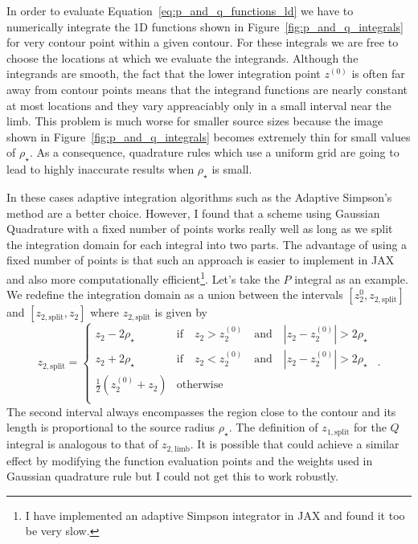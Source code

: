 \documentclass[12pt,dvipsnames]{report}
\newcommand{\ssf}[1]{\textsf{#1}}
\newcommand{\hquad}{~~}
\begin{document}
In order to evaluate Equation~\ref{eq:p_and_q_functions_ld} we have to numerically integrate
the 1D functions shown in Figure~\ref{fig:p_and_q_integrals} for very contour point within
a given contour.
For these integrals we are free to choose the locations at which we evaluate the integrands. 
Although the integrands are smooth, the fact that the  lower integration point $z^{(0)}$ is 
often far away from contour points means that the integrand
functions are nearly constant at most locations and they vary appreaciably only in a small
interval near the limb. This problem is much worse for smaller source sizes because the 
image shown in Figure~\ref{fig:p_and_q_integrals} becomes extremely thin for small values 
of $\rho_\star$. As a consequence, quadrature rules which use a uniform grid are going to 
lead to highly inaccurate results when $\rho_\star$ is small.

In these cases adaptive integration algorithms such as the Adaptive Simpson's method 
are a better choice. However, I found that a scheme using \ssf{Gaussian Quadrature} with a 
fixed number of points works really well as long as we split the integration domain for each 
integral into two parts. 
The advantage of using a fixed number of points is that such an approach is easier to implement 
in \ssf{JAX} and also more computationally efficient\footnote{I have implemented an
adaptive Simpson integrator in \ssf{JAX} and found it too be very slow.}. 
Let's take the $P$ integral as an example. We redefine the integration domain 
as a union between the intervals $[z_2^{0}, z_{2,\mathrm{split}}]$
and $[z_{2,\mathrm{split}}, z_2]$ where $z_{2, \mathrm{split}}$ is given by
\begin{equation}
        z_{2,\mathrm{split}}=
    \begin{cases}
       z_2 - 2\rho_\star & \text{if}\quad z_2> z_2^{(0)} \quad\text{and}\quad |z_2 - z_2^{(0)}|>2\rho_\star\\
       z_2 + 2\rho_\star & \text{if}\quad z_2 < z_2^{(0)} \quad\text{and}\quad |z_2 - z_2^{(0)}|>2\rho_\star\\
       \frac{1}{2}(z_2^{(0)} + z_2) &\text{otherwise}\\
    \end{cases}
    \hquad .
    \label{eq:z_split}
\end{equation}
The second interval always encompasses the region close to the contour and its length 
is proportional to the source radius $\rho_\star$.  The definition of $z_{1,\mathrm{split}}$
for the $Q$ integral is analogous to that of $z_{2, \mathrm{limb}}$.
It is possible that could achieve a similar effect by modifying the function evaluation 
points and the weights used in Gaussian quadrature rule but I could not get this to work 
robustly.
\end{document}
